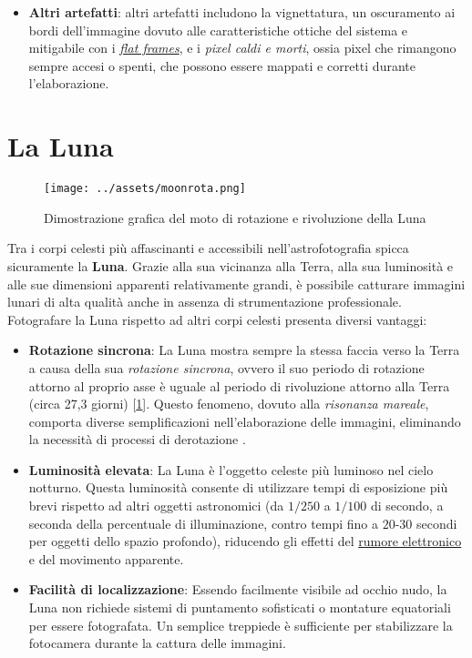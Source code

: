 \begin{itemize}
    \item \textbf{Altri artefatti}: altri artefatti includono la vignettatura, un oscuramento ai bordi dell'immagine dovuto alle caratteristiche ottiche del sistema e mitigabile con i \hyperref[subsec:flat]{\textit{flat frames}}, e i \textit{pixel caldi e morti},  ossia pixel che rimangono sempre accesi o spenti, che possono essere mappati e corretti durante l'elaborazione.

\end{itemize}

\section{La Luna} \label{sec:moon}

\begin{figure}[H]
    \centering
    \texttt{[image: ../assets/moonrota.png]}
    \captionsetup{justification=centering}
    \caption{Dimostrazione grafica del moto di rotazione e rivoluzione della Luna \cite{moon_rota}} \label{fig:moonrota}
\end{figure}

Tra i corpi celesti più affascinanti e accessibili nell'astrofotografia spicca sicuramente la \textbf{Luna}. Grazie alla sua vicinanza alla Terra, alla sua luminosità e alle sue dimensioni apparenti relativamente grandi, è possibile catturare immagini lunari di alta qualità anche in assenza di strumentazione professionale. Fotografare la Luna rispetto ad altri corpi celesti presenta diversi vantaggi:

\begin{itemize}
    \item \textbf{Rotazione sincrona}: La Luna mostra sempre la stessa faccia verso la Terra a causa della sua \textit{rotazione sincrona}, ovvero il suo periodo di rotazione attorno al proprio asse è uguale al periodo di rivoluzione attorno alla Terra (circa 27,3 giorni) [\cref{fig:moonrota}]. Questo fenomeno, dovuto alla \textit{risonanza mareale}, comporta diverse semplificazioni nell'elaborazione delle immagini, eliminando la necessità di processi di derotazione \cite{nasa_moon_orbit}.
    
    \item \textbf{Luminosità elevata}: La Luna è l'oggetto celeste più luminoso nel cielo notturno. Questa luminosità consente di utilizzare tempi di esposizione più brevi rispetto ad altri oggetti astronomici (da $1/250$ a $1/100$ di secondo, a seconda della percentuale di illuminazione, contro tempi fino a $20$-$30$ secondi per oggetti dello spazio profondo), riducendo gli effetti del \hyperref[sec:noise]{rumore elettronico} e del movimento apparente.
    
    \item \textbf{Facilità di localizzazione}: Essendo facilmente visibile ad occhio nudo, la Luna non richiede sistemi di puntamento sofisticati o montature equatoriali per essere fotografata. Un semplice treppiede è sufficiente per stabilizzare la fotocamera durante la cattura delle immagini.
\end{itemize}

